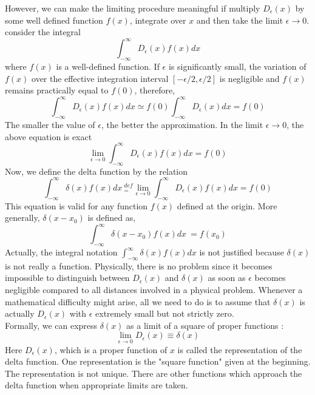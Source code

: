 	
	However, we can make the limiting procedure meaningful if multiply $D_\epsilon(x)$ by some well defined function $f(x)$, integrate over $x$ and then take the limit $\epsilon \rightarrow 0 $. consider the integral
	\begin{equation}
		\int_{-\infty}^{\infty} D_\epsilon(x) f(x) dx
	\end{equation}
	where $f(x)$ is a well-defined function. If $\epsilon$ is significantly small, the variation of $f(x)$ over the effective integration interval $[-\epsilon / 2, \epsilon / 2]$ is negligible and $f(x)$ remains practically equal to $f(0)$, therefore,
	\begin{equation}
		\int_{-\infty}^{\infty} D_\epsilon (x) f(x) dx \simeq f(0) \int_{-\infty}^{\infty} D_\epsilon (x) dx = f(0)
	\end{equation}
	The smaller the value of $\epsilon$, the better the approximation. In the limit $\epsilon \rightarrow 0$, the above equation is exact
	\begin{equation}
		\lim\limits_{\epsilon \rightarrow 0}\int_{-\infty}^{\infty} D_\epsilon (x) f(x) dx  = f(0)
	\end{equation}
	Now, we define the delta function by the relation
	\begin{equation}
		\int_{-\infty}^{\infty} \delta(x) f(x) dx \  _=^{def}  \lim\limits_{\epsilon \rightarrow 0}\int_{-\infty}^{\infty} D_\epsilon (x) f(x) dx  = f(0)
	\end{equation}
	This equation is valid for any function $f(x)$ defined at the origin. More generally, $\delta(x - x_0)$ is defined as,
	\begin{equation}
		\int_{-\infty}^{\infty} \delta(x - x_0) f(x) dx \ = f(x_0)
	\end{equation}
	Actually, the integral notation $\int_{-\infty}^{\infty} \delta(x) f(x) dx$ is not justified because $\delta(x)$ is not really a function. Physically, there is no problem since it becomes impossible to distinguish between $D_\epsilon(x)$ and $\delta(x)$ as soon as $\epsilon$ becomes negligible compared to all distances involved in a physical problem. Whenever a mathematical difficulty might arise, all we need to do is to assume that $\delta(x)$ is actually $D_\epsilon(x)$ with $\epsilon$ extremely small but not strictly zero.
	\\
	Formally, we can express $\delta(x)$ as a limit of a square of proper functions : 
	\begin{equation}
		\lim\limits_{\epsilon \rightarrow 0} D_\epsilon(x) \equiv \delta(x)
	\end{equation}
	Here $D_\epsilon(x)$, which is a proper function of $x$ is called the representation of the delta function. One representation is the "square function" given at the beginning. The representation is not unique. There are other functions which approach the delta function when appropriate limits are taken.
	
